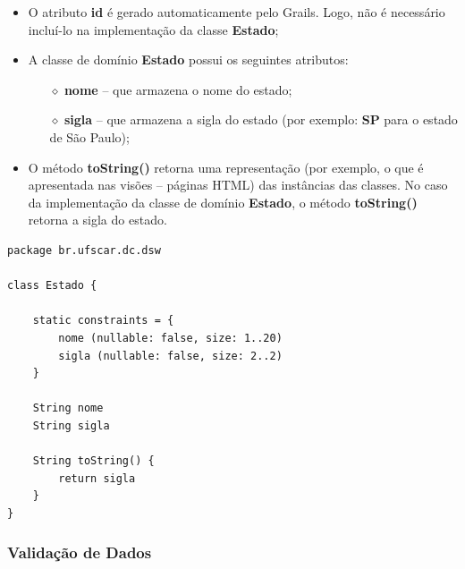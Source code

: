 \begin{itemize}

\item O  atributo {\bf  id} é  gerado automaticamente pelo  Grails. Logo,  não é
  necessário incluí-lo na implementação da classe {\bf Estado}; 

\vspace{0.2cm}

\item A classe de domínio {\bf Estado} possui os seguintes atributos:

\vspace{0.2cm}

\begin{itemize}

\item[$\diamond$] {\bf nome} -- que armazena o nome do estado;

\vspace{0.2cm}

\item[$\diamond$] {\bf  sigla} -- que armazena  a sigla do  estado (por exemplo:
  {\bf SP} para o estado de São Paulo); 

\end{itemize}

\vspace{0.5cm}

\item O método {\bf toString()} retorna  uma representação (por exemplo, o que é
  apresentada nas visões – páginas HTML) das instâncias das classes.  No caso da
  implementação da  classe de  domínio {\bf Estado},  o método  {\bf toString()}
  retorna a sigla do estado.
 
\end{itemize}

\newpage

\begin{lstlisting}[caption=Classe  de  domínio   {\bf  Estado},  frame  =  trBL,
    float=htbp, label=codEstado] 
package br.ufscar.dc.dsw

class Estado {

    static constraints = {
        nome (nullable: false, size: 1..20)
        sigla (nullable: false, size: 2..2)
    }
    
    String nome    
    String sigla
    
    String toString() {
        return sigla
    }
}
\end{lstlisting}

\subsubsection{Validação de Dados}\label{validacao}

